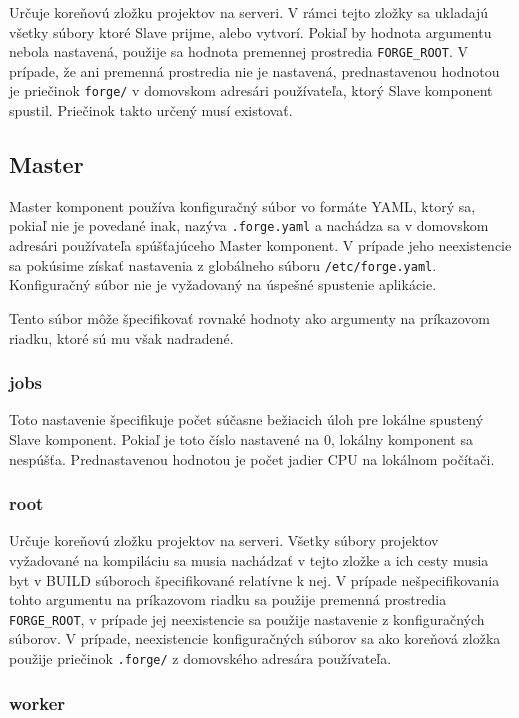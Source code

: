 Určuje koreňovú zložku projektov na serveri. V rámci tejto zložky sa ukladajú všetky
súbory ktoré Slave prijme, alebo vytvorí. Pokiaľ by hodnota argumentu nebola nastavená,
použije sa hodnota premennej prostredia \texttt{FORGE\_ROOT}. V prípade, že ani premenná
prostredia nie je nastavená, prednastavenou hodnotou je priečinok \texttt{forge/} v domovskom
adresári používateľa, ktorý Slave komponent spustil. Priečinok takto určený musí existovať.

\subsection{Master}
\label{sec:configuration:master}

Master komponent používa konfiguračný súbor vo formáte YAML, ktorý sa, pokiaľ
nie je povedané inak, nazýva \texttt{.forge.yaml} a nachádza sa v domovskom adresári
používateľa spúšťajúceho Master komponent. V prípade jeho neexistencie sa pokúsime
získať nastavenia z globálneho súboru \texttt{/etc/forge.yaml}. Konfiguračný súbor
nie je vyžadovaný na úspešné spustenie aplikácie.

Tento súbor môže špecifikovať rovnaké hodnoty ako argumenty na príkazovom riadku, ktoré
sú mu však nadradené.

\subsubsection{jobs}

Toto nastavenie špecifikuje počet súčasne bežiacich úloh pre lokálne spustený
Slave komponent. Pokiaľ je toto číslo nastavené na 0, lokálny komponent sa nespúšťa.
Prednastavenou hodnotou je počet jadier CPU na lokálnom počítači.

\subsubsection{root}

Určuje koreňovú zložku projektov na serveri. Všetky súbory projektov vyžadované
na kompiláciu sa musia nachádzať v tejto zložke a ich cesty musia byt v BUILD súboroch
špecifikované relatívne k nej. V prípade nešpecifikovania tohto argumentu na príkazovom
riadku sa použije premenná prostredia \texttt{FORGE\_ROOT}, v prípade jej neexistencie
sa použije nastavenie z konfiguračných súborov. V prípade, neexistencie konfiguračných
súborov sa ako koreňová zložka použije priečinok \texttt{.forge/} z domovského
adresára používateľa.

\subsubsection{worker}

